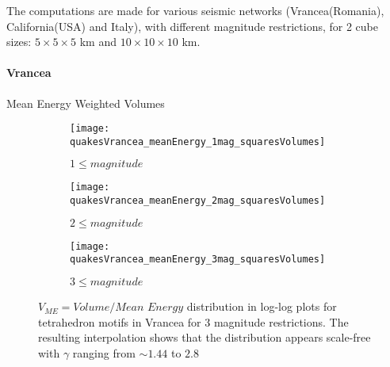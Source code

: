 The computations are made for various seismic networks (Vrancea(Romania), California(USA) and Italy), with different magnitude restrictions, for 2 cube sizes: $5\times5\times5$ km and $10\times10\times10$ km.

\clearpage
\paragraph{Vrancea} Mean Energy Weighted Volumes
\begin{figure}[!h]
\begin{subfigure}{.99\textwidth}
  \centering
  \texttt{[image: quakesVrancea\_meanEnergy\_1mag\_squaresVolumes]}
  \caption{$1 \leq magnitude$}
  \label{fig:volumesVrME1}
\end{subfigure}%

\begin{subfigure}{.99\textwidth}
  \centering
  \texttt{[image: quakesVrancea\_meanEnergy\_2mag\_squaresVolumes]}
  \caption{$2 \leq magnitude$}
  \label{fig:volumesVrME2}
\end{subfigure}%

\begin{subfigure}{.99\textwidth}
  \centering
  \texttt{[image: quakesVrancea\_meanEnergy\_3mag\_squaresVolumes]}
  \caption{$3 \leq magnitude$}
  \label{fig:volumesVrME3}
\end{subfigure}%

\caption{$V_{ME} = Volume/Mean$ $Energy$ distribution in log-log plots for tetrahedron motifs in Vrancea for 3 magnitude restrictions. The resulting interpolation shows that the distribution appears scale-free with $\gamma$ ranging from $\sim 1.44$ to $2.8$}
\label{fig:tetrahedronsVolumesVrME}
\end{figure}

\clearpage
